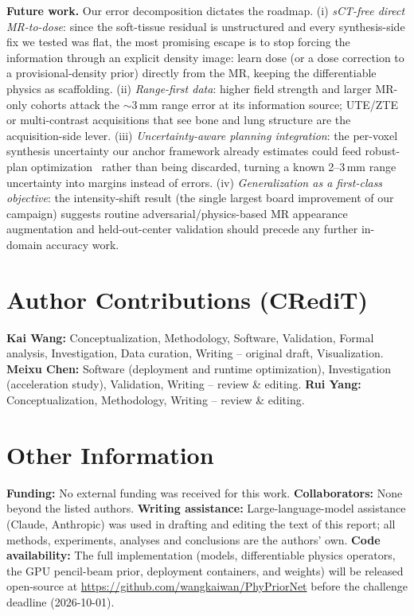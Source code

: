 \documentclass{llncs}
\begin{document}
\textbf{Future work.} Our error decomposition dictates the roadmap. (i) \emph{sCT-free direct
MR-to-dose}: since the soft-tissue residual is unstructured and every synthesis-side fix we
tested was flat, the most promising escape is to stop forcing the information through an
explicit density image: learn dose (or a dose correction to a provisional-density prior)
directly from the MR, keeping the differentiable physics as scaffolding. (ii) \emph{Range-first
data}: higher field strength and larger MR-only cohorts attack the $\sim$3\,mm range error at
its information source; UTE/ZTE or multi-contrast acquisitions that see bone and lung structure
are the acquisition-side lever. (iii) \emph{Uncertainty-aware planning integration}: the
per-voxel synthesis uncertainty our anchor framework already estimates could feed robust-plan
optimization~\cite{uncert} rather than being discarded, turning a known 2--3\,mm range
uncertainty into margins instead of errors. (iv) \emph{Generalization as a first-class
objective}: the intensity-shift result (the single largest board improvement of our
campaign) suggests routine adversarial/physics-based MR appearance augmentation and
held-out-center validation should precede any further in-domain accuracy work.

\section{Author Contributions (CRediT)}
\textbf{Kai Wang:} Conceptualization, Methodology, Software, Validation, Formal analysis,
Investigation, Data curation, Writing -- original draft, Visualization.
\textbf{Meixu Chen:} Software (deployment and runtime optimization), Investigation
(acceleration study), Validation, Writing -- review \& editing.
\textbf{Rui Yang:} Conceptualization, Methodology, Writing -- review \& editing.

\section{Other Information}
\textbf{Funding:} No external funding was received for this work.
\textbf{Collaborators:} None beyond the listed authors.
\textbf{Writing assistance:} Large-language-model assistance (Claude, Anthropic) was used in drafting and editing the text of this report; all methods, experiments, analyses and conclusions are the authors' own.
\textbf{Code availability:} The full implementation (models, differentiable physics operators,
the GPU pencil-beam prior, deployment containers, and weights) will be released open-source at
\url{https://github.com/wangkaiwan/PhyPriorNet} before the challenge deadline (2026-10-01).
\end{document}
